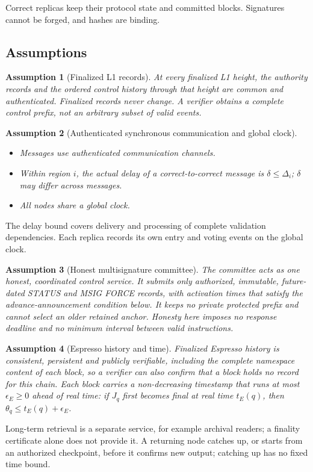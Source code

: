 \documentclass[11pt,a4paper]{article}
\newtheorem{assumption}[assumption]{Assumption}
\newcounter{protocol}
\begin{document}
Correct replicas keep their protocol state and committed blocks.
Signatures cannot be forged, and hashes are binding.

\subsection{Assumptions}
\label{sec:assumptions}
\begin{assumption}[Finalized L1 records]
\label{ass:authority}
At every finalized L1 height, the authority records and the ordered
control history through that height are common and authenticated.
Finalized records never change. A verifier obtains a complete control
prefix, not an arbitrary subset of valid events.
\end{assumption}

\begin{assumption}[Authenticated synchronous communication and global clock]
\label{ass:network}
\leavevmode\par
\begin{itemize}
\item Messages use authenticated communication channels.
\item Within region $i$, the actual delay of a correct-to-correct
message is $\delta\le\Delta_i$; $\delta$ may differ across messages.
\item All nodes share a global clock.
\end{itemize}
\end{assumption}
The delay bound covers delivery and processing of complete validation
dependencies. Each replica records its own entry and voting events on
the global clock.

\begin{assumption}[Honest multisignature committee]
\label{ass:committee}
The committee acts as one honest, coordinated control service. It
submits only authorized, immutable, future-dated STATUS and MSIG FORCE
records, with activation times that satisfy the advance-announcement
condition below. It keeps no private protected prefix and cannot select
an older retained anchor. Honesty here imposes no response deadline and
no minimum interval between valid instructions.
\end{assumption}

\begin{assumption}[Espresso history and time]
\label{ass:espresso}
Finalized Espresso history is consistent, persistent and publicly
verifiable, including the complete namespace content of each block, so a
verifier can also confirm that a block holds no record for this chain.
Each block carries a non-decreasing timestamp that runs at most
$\epsilon_E\ge0$ ahead of real time: if $J_q$ first becomes final at real
time $t_E(q)$, then $\theta_q\le t_E(q)+\epsilon_E$.
\end{assumption}
Long-term retrieval is a separate service, for example archival readers;
a finality certificate alone does not provide it. A returning node
catches up, or starts from an authorized checkpoint, before it confirms
new output; catching up has no fixed time bound.
\end{document}
